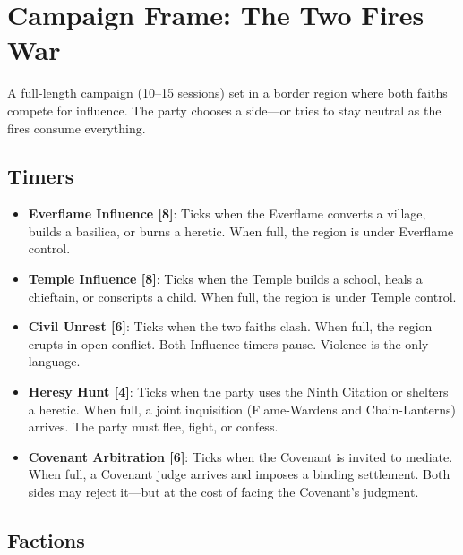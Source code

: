 \documentclass{book}
\begin{document}
\section{Campaign Frame: The Two Fires War}

A full-length campaign (10--15 sessions) set in a border region where both faiths compete for influence. The party chooses a side---or tries to stay neutral as the fires consume everything.

\subsection{Timers}

\begin{itemize}
\item \textbf{Everflame Influence [8]}: Ticks when the Everflame converts a village, builds a basilica, or burns a heretic. When full, the region is under Everflame control.
\item \textbf{Temple Influence [8]}: Ticks when the Temple builds a school, heals a chieftain, or conscripts a child. When full, the region is under Temple control.
\item \textbf{Civil Unrest [6]}: Ticks when the two faiths clash. When full, the region erupts in open conflict. Both Influence timers pause. Violence is the only language.
\item \textbf{Heresy Hunt [4]}: Ticks when the party uses the Ninth Citation or shelters a heretic. When full, a joint inquisition (Flame-Wardens and Chain-Lanterns) arrives. The party must flee, fight, or confess.
\item \textbf{Covenant Arbitration [6]}: Ticks when the Covenant is invited to mediate. When full, a Covenant judge arrives and imposes a binding settlement. Both sides may reject it---but at the cost of facing the Covenant's judgment.
\end{itemize}

\subsection{Factions}
\end{document}
